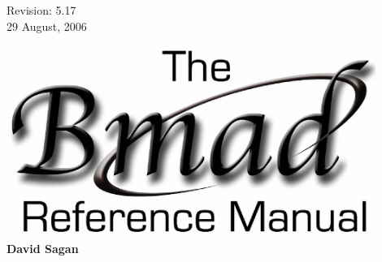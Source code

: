 \thispagestyle{empty}

\begin{flushright}
\large
  Revision: 5.17 \\
  29 August, 2006 \\
\end{flushright}

\vfill

{
\begin{center}
\includegraphics[width=12cm]{bmad_ref_manual.eps} \\
\vskip 0.3in
\huge\bf David Sagan
\end{center}
}

\vfill
\break
